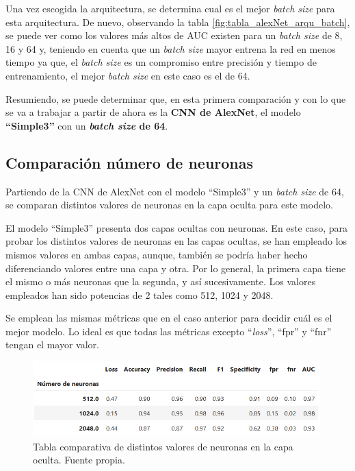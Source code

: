 Una vez escogida la arquitectura, se determina cual es el mejor \textit{batch size} para esta arquitectura. De nuevo, observando la tabla \ref{fig:tabla_alexNet_arqu_batch}, se puede ver como los valores más altos de AUC existen para un \textit{batch size} de 8, 16 y 64 y, teniendo en cuenta que un \textit{batch size} mayor entrena la red en menos tiempo ya que, el \textit{batch size} es un compromiso entre precisión y tiempo de entrenamiento, el mejor \textit{batch size} en este caso es el de 64.

Resumiendo, se puede determinar que, en esta primera comparación y con lo que se va a trabajar a partir de ahora es la \textbf{CNN de AlexNet}, el modelo \textbf{``Simple3''} con un \textbf{\textit{batch size} de 64}.

\subsection{Comparación número de neuronas}
Partiendo de la CNN de AlexNet con el modelo ``Simple3'' y un \textit{batch size} de 64, se comparan distintos valores de neuronas en la capa oculta para este modelo.

El modelo ``Simple3'' presenta dos capas ocultas con neuronas. En este caso, para probar los distintos valores de neuronas en las capas ocultas, se han empleado los mismos valores en ambas capas, aunque, también se podría haber hecho diferenciando valores entre una capa y otra. Por lo general, la primera capa tiene el mismo o más neuronas que la segunda, y así sucesivamente. Los valores empleados han sido potencias de 2 tales como 512, 1024 y 2048.

Se emplean las mismas métricas que en el caso anterior para decidir cuál es el mejor modelo. Lo ideal es que todas las métricas excepto ``\textit{loss}'', ``fpr'' y ``fnr'' tengan el mayor valor. 

\begin{figure}[h]
    \centering
    \includegraphics[width=0.99\textwidth]{img/tabla_num_neuronas.PNG}
    \caption{Tabla comparativa de distintos valores de neuronas en la capa oculta. Fuente propia.}
    \label{fig:tabla_num_neuronas}
\end{figure}
\FloatBarrier

